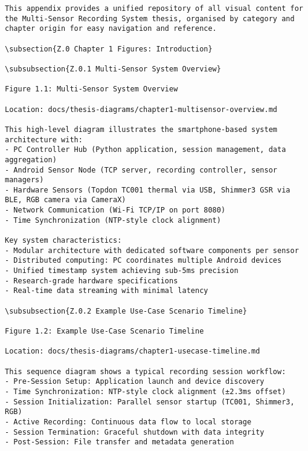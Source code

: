 \begin{verbatim}
This appendix provides a unified repository of all visual content for the Multi-Sensor Recording System thesis, organised by category and chapter origin for easy navigation and reference.

\subsection{Z.0 Chapter 1 Figures: Introduction}

\subsubsection{Z.0.1 Multi-Sensor System Overview}

Figure 1.1: Multi-Sensor System Overview

Location: docs/thesis-diagrams/chapter1-multisensor-overview.md

This high-level diagram illustrates the smartphone-based system architecture with:
- PC Controller Hub (Python application, session management, data aggregation)
- Android Sensor Node (TCP server, recording controller, sensor managers)
- Hardware Sensors (Topdon TC001 thermal via USB, Shimmer3 GSR via BLE, RGB camera via CameraX)
- Network Communication (Wi-Fi TCP/IP on port 8080)
- Time Synchronization (NTP-style clock alignment)

Key system characteristics:
- Modular architecture with dedicated software components per sensor
- Distributed computing: PC coordinates multiple Android devices
- Unified timestamp system achieving sub-5ms precision
- Research-grade hardware specifications
- Real-time data streaming with minimal latency

\subsubsection{Z.0.2 Example Use-Case Scenario Timeline}

Figure 1.2: Example Use-Case Scenario Timeline

Location: docs/thesis-diagrams/chapter1-usecase-timeline.md

This sequence diagram shows a typical recording session workflow:
- Pre-Session Setup: Application launch and device discovery
- Time Synchronization: NTP-style clock alignment (±2.3ms offset)
- Session Initialization: Parallel sensor startup (TC001, Shimmer3, RGB)
- Active Recording: Continuous data flow to local storage
- Session Termination: Graceful shutdown with data integrity
- Post-Session: File transfer and metadata generation


\end{verbatim}
